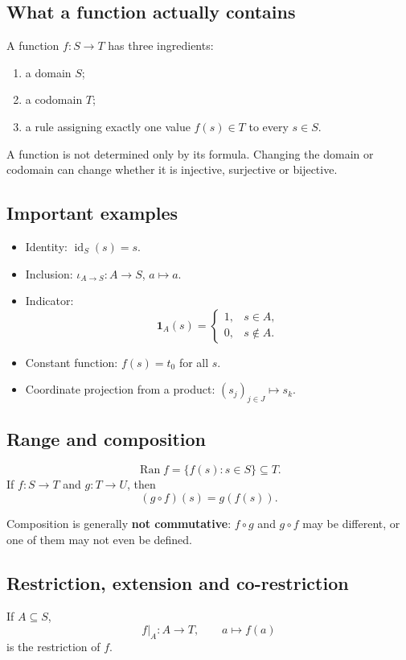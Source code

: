 \documentclass[11pt,a4paper]{article}
\newcommand{\Ran}{\operatorname{Ran}}
\newcommand{\id}{\operatorname{id}}
\begin{document}
\subsection{What a function actually contains}
A function $f:S\to T$ has three ingredients:
\begin{enumerate}
\item a domain $S$;
\item a codomain $T$;
\item a rule assigning exactly one value $f(s)\in T$ to every $s\in S$.
\end{enumerate}

\begin{trapbox}
A function is not determined only by its formula. Changing the domain or codomain can change whether it is injective, surjective or bijective.
\end{trapbox}

\subsection{Important examples}
\begin{itemize}
\item Identity: $\id_S(s)=s$.
\item Inclusion: $\iota_{A\to S}:A\to S$, $a\mapsto a$.
\item Indicator:
\[
\mathbf 1_A(s)=\begin{cases}1,&s\in A,\\0,&s\notin A.\end{cases}
\]
\item Constant function: $f(s)=t_0$ for all $s$.
\item Coordinate projection from a product: $(s_j)_{j\in J}\mapsto s_k$.
\end{itemize}

\subsection{Range and composition}
\[
\Ran f=\{f(s):s\in S\}\subseteq T.
\]
If $f:S\to T$ and $g:T\to U$, then
\[
(g\circ f)(s)=g(f(s)).
\]

\begin{trapbox}
Composition is generally \textbf{not commutative}: $f\circ g$ and $g\circ f$ may be different, or one of them may not even be defined.
\end{trapbox}

\subsection{Restriction, extension and co-restriction}
If $A\subseteq S$,
\[
f|_A:A\to T,\qquad a\mapsto f(a)
\]
is the restriction of $f$.
\end{document}
